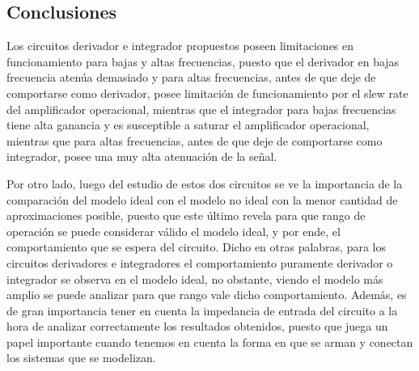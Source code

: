 \subsection{Conclusiones}
Los circuitos derivador e integrador propuestos poseen limitaciones en funcionamiento para bajas y altas
frecuencias, puesto que el derivador en bajas frecuencia aten\'ua demasiado y para altas frecuencias, antes de que deje de comportarse como derivador, posee limitaci\'on de funcionamiento por
el slew rate del amplificador operacional, mientras que el integrador para bajas frecuencias tiene alta ganancia y es susceptible a saturar el amplificador operacional, mientras que para altas frecuencias,
antes de que deje de comportarse como integrador, posee una muy alta atenuaci\'on de la se\~nal.

Por otro lado, luego del estudio de estos dos circuitos se ve la importancia de la comparaci\'on del modelo ideal con el modelo no ideal con la menor
cantidad de aproximaciones posible, puesto que este \'ultimo revela para que rango de operaci\'on se puede considerar v\'alido el modelo ideal, y por ende,
el comportamiento que se espera del circuito. Dicho en otras palabras, para los circuitos derivadores e integradores el comportamiento puramente derivador o integrador
se observa en el modelo ideal, no obstante, viendo el modelo m\'as amplio se puede analizar para que rango vale dicho comportamiento. Adem\'as, es de gran importancia
tener en cuenta la impedancia de entrada del circuito a la hora de analizar correctamente los resultados obtenidos, puesto que juega un papel importante cuando tenemos en cuenta
la forma en que se arman y conectan los sistemas que se modelizan.


